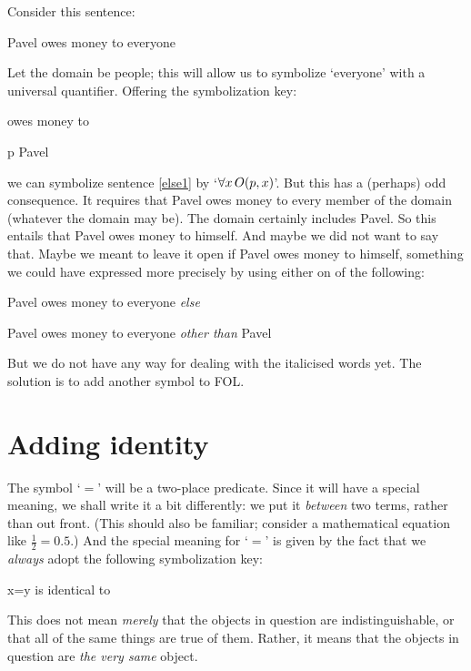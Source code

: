 Consider this sentence:
\begin{earg}
\item[\ex{else1}] Pavel owes money to everyone
\end{earg}
Let the domain be people; this will allow us to symbolize `everyone' with a universal quantifier. Offering the symbolization key:
	\begin{ekey}
		\item[\atom{O}{x,y}]  owes money to 
		\item[p] Pavel
	\end{ekey}
we can symbolize sentence \ref{else1} by `$\forall x\, \mathord{O}(p,x)$'. But this has a (perhaps) odd consequence. It requires that Pavel owes money to every member of the domain (whatever the domain may be). The domain certainly includes Pavel. So this entails that Pavel owes money to himself. And maybe we did not want to say that. Maybe we meant to leave it open if Pavel owes money to himself, something we could have expressed more precisely by using either on of the following:
	\begin{earg}
		\item[\ex{else1b}] Pavel owes money to everyone \emph{else}
		\item[\ex{else1c}] Pavel owes money to everyone \emph{other than} Pavel
	\end{earg}
But we do not have any way for dealing with the italicised words yet. The solution is to add another symbol to FOL.

\section{Adding identity}

The symbol `$=$' will be a two-place predicate. Since it will have a special meaning, we shall write it a bit differently: we put it \emph{between} two terms, rather than out front. (This should also be familiar; consider a mathematical equation like $\frac{1}{2} = 0.5$.) And the special meaning for `$=$' is given by the fact that we \emph{always} adopt the following symbolization key: 
	\begin{ekey}
		\item[x=y]  is identical to \gap{y}
	\end{ekey}
This does not mean \emph{merely} that the objects in question are indistinguishable, or that all of the same things are true of them. Rather, it means that the objects in question are \emph{the very same} object.

